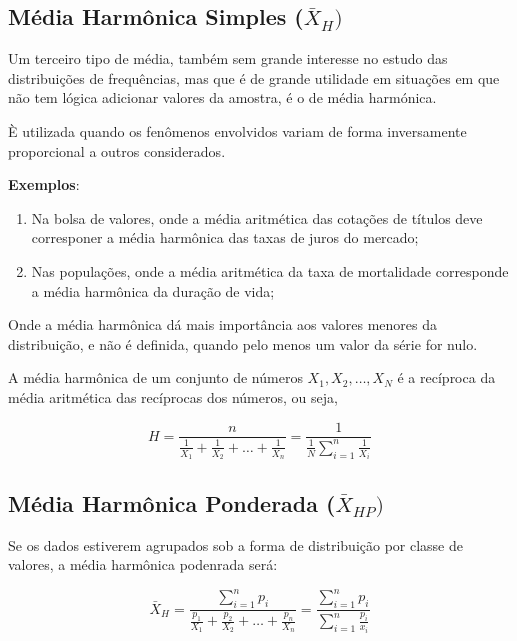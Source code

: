 \subsection{Média Harmônica Simples ($\bar{X}_{H})$}


\inic Um terceiro tipo de média, também sem grande interesse no estudo das
distribuições de frequências, mas que é de grande utilidade em situações em que não
tem lógica adicionar valores da amostra, é o de média harmónica.\vskip0.3cm



È utilizada quando os fenômenos envolvidos variam de forma inversamente proporcional a outros considerados.\vskip0.3cm

\textbf{Exemplos}:
\begin{enumerate}
  \item Na bolsa de valores, onde a média aritmética das cotações de títulos deve corresponer a média harmônica das taxas de juros do mercado;
  \item Nas populações, onde a média aritmética da taxa de mortalidade corresponde a média harmônica da duração de vida;
\end{enumerate}

Onde a média harmônica dá mais importância aos valores menores da distribuição, e não é definida, quando pelo menos um valor da série for nulo.\vskip0.3cm


A média harmônica de um conjunto de números $X_{1},X_{2},\ldots,X_{N}$ é a recíproca da média
aritmética das recíprocas dos números, ou seja,

\begin{equation}\label{harmonica}
    H=\frac{n}{\frac{1}{X_{1}}+\frac{1}{X_{2}}+\ldots+\frac{1}{X_{n}}}=\frac{1}{\frac{1}{N}\sum_{i=1}^{n}\frac{1}{X_{i}}}
    \end{equation}

\subsection{Média Harmônica Ponderada ($\bar{X}_{HP})$}


Se os dados estiverem agrupados sob a forma de distribuição por classe de valores, a média harmônica podenrada será:


\begin{equation}\label{harmonicapondrada}
    \bar{X}_{H}=\frac{\sum_{i=1}^{n}p_{i}}{\frac{p_{1}}{X_{1}}+\frac{p_{2}}{X_{2}}+\ldots+\frac{p_{n}}{X_{n}}}=\frac{\sum_{i=1}^{n}p_{i}}{\sum_{i=1}^{n}\frac{p_{i}}{x_{i}}}
\end{equation}


